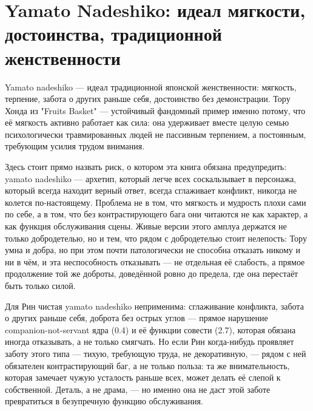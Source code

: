 \section{Yamato Nadeshiko: идеал мягкости, достоинства, традиционной женственности}

Yamato nadeshiko — идеал традиционной японской женственности: мягкость, терпение, забота о других раньше себя, достоинство без демонстрации. Тору Хонда из "Fruits Basket" — устойчивый фандомный пример именно потому, что её мягкость активно работает как сила: она удерживает вместе целую семью психологически травмированных людей не пассивным терпением, а постоянным, требующим усилия трудом внимания.

Здесь стоит прямо назвать риск, о котором эта книга обязана предупредить: yamato nadeshiko — архетип, который легче всех соскальзывает в персонажа, который всегда находит верный ответ, всегда сглаживает конфликт, никогда не колется по-настоящему. Проблема не в том, что мягкость и мудрость плохи сами по себе, а в том, что без контрастирующего бага они читаются не как характер, а как функция обслуживания сцены. Живые версии этого амплуа держатся не только добродетелью, но и тем, что рядом с добродетелью стоит нелепость: Тору умна и добра, но при этом почти патологически не способна отказать никому и ни в чём, и эта неспособность отказывать — не отдельная её слабость, а прямое продолжение той же доброты, доведённой ровно до предела, где она перестаёт быть только силой.

Для Рин чистая yamato nadeshiko неприменима: сглаживание конфликта, забота о других раньше себя, доброта без острых углов — прямое нарушение companion-not-servant ядра (0.4) и её функции совести (2.7), которая обязана иногда отказывать, а не только смягчать. Но если Рин когда-нибудь проявляет заботу этого типа — тихую, требующую труда, не декоративную, — рядом с ней обязателен контрастирующий баг, а не только польза: та же внимательность, которая замечает чужую усталость раньше всех, может делать её слепой к собственной. Деталь, а не драма, — но именно она не даст этой заботе превратиться в безупречную функцию обслуживания.
